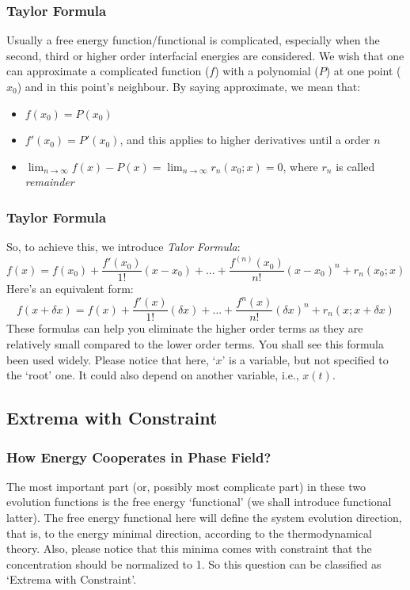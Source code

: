 \documentclass[compress]{beamer}
\begin{document}
\begin{frame}
  \frametitle{Taylor Formula}
  Usually a free energy function/functional is complicated, especially when the second, third or higher order interfacial energies are considered.
  We wish that one can approximate a complicated function (\(f\)) with a polynomial (\(P\)) at one point (\(x_0\)) and in this point's neighbour.
  By saying approximate, we mean that:

  \begin{itemize}
    \item \(f(x_0) = P(x_0)\)
    \item \(f'(x_0) = P'(x_0)\), and this applies to higher derivatives until a order \(n\)
    \item \(\lim_{n\to\infty} f(x) - P(x) = \lim_{n\to\infty} r_n(x_0;x) = 0 \), where \(r_n\) is called \emph{remainder}
  \end{itemize}

\end{frame}

\begin{frame}
  \frametitle{Taylor Formula}
  So, to achieve this, we introduce \emph{Talor Formula}:
  \[
    f(x) = f(x_0) + \frac{f'(x_0)}{1!}\left( x-x_0 \right) + \dots + \frac{f^{(n)}(x_0)}{n!}\left( x-x_0 \right)^n
    +r_n( x_0;x )
  \]
  Here's an equivalent form:
  \[
    f(x+\delta{x}) = f(x) + \frac{f'(x)}{1!}\left( \delta{x} \right)+\dots+\frac{f^{n}(x)}{n!}\left( \delta{x} \right)^n+r_n(x;x+\delta{x})
  \]
  These formulas can help you eliminate the higher order terms as they are relatively small compared to the lower order terms. You shall see this
  formula been used widely. Please notice that here, `\(x\)' is a variable, but not specified to the `root' one. It could also depend on another variable,
  i.e., \(x(t)\).
\end{frame}

\subsection{Extrema with Constraint}
\begin{frame}
  \frametitle{How Energy Cooperates in Phase Field?}
  The most important part (or, possibly most complicate part) in these two evolution functions is the free energy `functional' (we shall
  introduce functional latter). The free energy functional here will define the system evolution direction, that is, to the energy minimal
  direction, according to the thermodynamical theory. Also, please notice that this minima comes with constraint that the concentration should
  be normalized to 1. So this question can be classified as `Extrema with Constraint'.
\end{frame}
\end{document}
